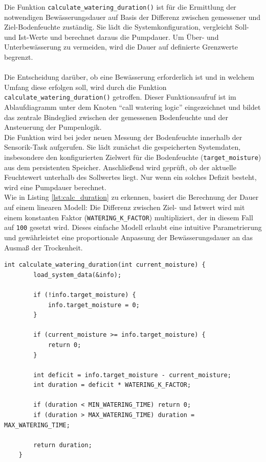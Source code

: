 Die Funktion \texttt{calculate\_watering\_duration()} ist für die Ermittlung der notwendigen Bewässerungsdauer auf Basis der Differenz zwischen gemessener und Ziel-Bodenfeuchte zuständig. Sie lädt die Systemkonfiguration, vergleicht Soll- und Ist-Werte und berechnet daraus die Pumpdauer. Um Über- und Unterbewässerung zu vermeiden, wird die Dauer auf definierte Grenzwerte begrenzt.
\\
\\
Die Entscheidung darüber, ob eine Bewässerung erforderlich ist und in welchem Umfang diese erfolgen soll, wird durch die Funktion \texttt{calculate\_watering\_duration()} getroffen. Dieser Funktionsaufruf ist im Ablaufdiagramm unter dem Knoten \enquote{call watering logic} eingezeichnet und bildet das zentrale Bindeglied zwischen der gemessenen Bodenfeuchte und der Ansteuerung der Pumpenlogik.
\\
Die Funktion wird bei jeder neuen Messung der Bodenfeuchte innerhalb der Sensorik-Task aufgerufen. Sie lädt zunächst die gespeicherten Systemdaten, insbesondere den konfigurierten Zielwert für die Bodenfeuchte (\texttt{target\_moisture}) aus dem persistenten Speicher. Anschließend wird geprüft, ob der aktuelle Feuchtewert unterhalb des Sollwertes liegt. Nur wenn ein solches Defizit besteht, wird eine Pumpdauer berechnet.
\\
Wie in Listing \vref{lst:calc_duration} zu erkennen, basiert die Berechnung der Dauer auf einem linearen Modell: Die Differenz zwischen Ziel- und Istwert wird mit einem konstanten Faktor (\texttt{WATERING\_K\_FACTOR}) multipliziert, der in diesem Fall auf \texttt{100} gesetzt wird. Dieses einfache Modell erlaubt eine intuitive Parametrierung und gewährleistet eine proportionale Anpassung der Bewässerungsdauer an das Ausmaß der Trockenheit.
\newpage

\begin{lstlisting}[style=cstyle, caption={Berechnung der Bewässerungsdauer}, label={lst:calc_duration}]
	int calculate_watering_duration(int current_moisture) {
		load_system_data(&info);
		
		if (!info.target_moisture) {
			info.target_moisture = 0;
		}
		
		if (current_moisture >= info.target_moisture) {
			return 0;
		}
		
		int deficit = info.target_moisture - current_moisture;
		int duration = deficit * WATERING_K_FACTOR;
		
		if (duration < MIN_WATERING_TIME) return 0;
		if (duration > MAX_WATERING_TIME) duration = MAX_WATERING_TIME;
		
		return duration;
	}
\end{lstlisting}
\vspace{1em}

